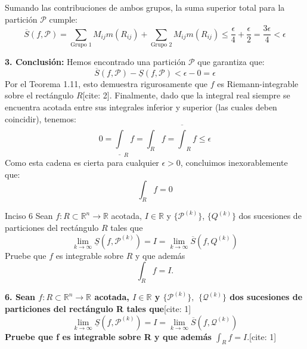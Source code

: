 \documentclass[11pt,letterpaper]{article}
\begin{document}
Sumando las contribuciones de ambos grupos, la suma superior total para la partición $\mathcal{P}$ cumple:
\begin{equation*}
\overline{S}(f, \mathcal{P}) = \sum_{\text{Grupo 1}} M_{ij} m(R_{ij}) + \sum_{\text{Grupo 2}} M_{ij} m(R_{ij}) \le \frac{\epsilon}{4} + \frac{\epsilon}{2} = \frac{3\epsilon}{4} < \epsilon
\end{equation*}

\textbf{3. Conclusión:}
Hemos encontrado una partición $\mathcal{P}$ que garantiza que:
\begin{equation*}
\overline{S}(f, \mathcal{P}) - \underline{S}(f, \mathcal{P}) < \epsilon - 0 = \epsilon
\end{equation*}
Por el Teorema 1.11, esto demuestra rigurosamente que $f$ es Riemann-integrable sobre el rectángulo $R$[cite: 2].
Finalmente, dado que la integral real siempre se encuentra acotada entre sus integrales inferior y superior (las cuales deben coincidir), tenemos:
\begin{equation*}
0 = \underline{\int}_{R} f = \int_{R} f = \overline{\int}_{R} f \le \epsilon
\end{equation*}
Como esta cadena es cierta para cualquier $\epsilon > 0$, concluimos inexorablemente que:
\begin{equation*}
\int_{R} f = 0
\end{equation*}

\begin{inciso}{Inciso 6}
Sean $f:R\subset\mathbb{R}^{n}\rightarrow\mathbb{R}$ acotada, $I\in\mathbb{R}$ y $\{\mathcal{P}^{(k)}\}$, $\{Q^{(k)}\}$ dos sucesiones de particiones del rectángulo $R$ tales que
\begin{equation*}
    \lim_{k\rightarrow\infty}\underline{S}(f,\mathcal{P}^{(k)})=I=\lim_{k\rightarrow\infty}\overline{S}(f,Q^{(k)})
\end{equation*}
Pruebe que $f$ es integrable sobre $R$ y que además
\begin{equation*}
    \int_{R}f=I.
\end{equation*}
\end{inciso}

\textbf{6. Sean $f:R\subset\mathbb{R}^{n}\rightarrow\mathbb{R}$ acotada, $I\in\mathbb{R}$ y $\{\mathcal{P}^{(k)}\},$ $\{\mathcal{Q}^{(k)}\}$ dos sucesiones de particiones del rectángulo R tales que}[cite: 1]
\begin{equation*}
\lim_{k\rightarrow\infty}\underline{S}(f,\mathcal{P}^{(k)}) = I = \lim_{k\rightarrow\infty}\overline{S}(f,\mathcal{Q}^{(k)})
\end{equation*}
\textbf{Pruebe que f es integrable sobre R y que además $\int_{R}f=I.$}[cite: 1]
\end{document}
